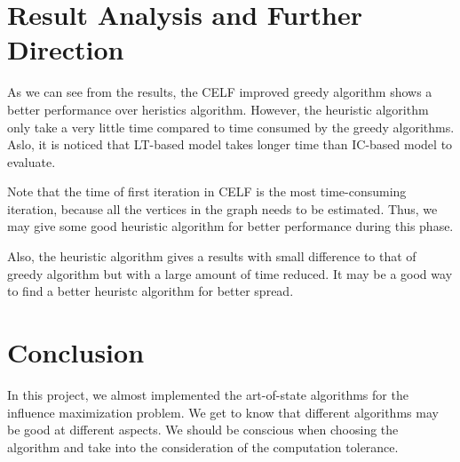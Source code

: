\documentclass[journal,twoside,web]{ieeecolor}
\begin{document}
\section{Result Analysis and Further Direction}
As we can see from the results, the CELF improved greedy algorithm shows a better performance over heristics algorithm. However, the heuristic algorithm only take a very little time compared to time consumed by the greedy algorithms. Aslo, it is noticed that LT-based model takes longer time than IC-based model to evaluate.
\par
Note that the time of first iteration in CELF is the most time-consuming iteration, because all the vertices in the graph needs to be estimated. Thus, we may give some good heuristic algorithm for better performance during this phase. 
\par 
Also, the heuristic algorithm gives a results with small difference to that of greedy algorithm but with a large amount of time reduced. It may be a good way to find a better heuristc algorithm for better spread.
\section{Conclusion}

In this project, we almost implemented the art-of-state algorithms for the influence maximization problem. We get to know that different algorithms may be good at different aspects. We should be conscious when choosing the algorithm and take into the consideration of the computation tolerance.
 



\end{document}
